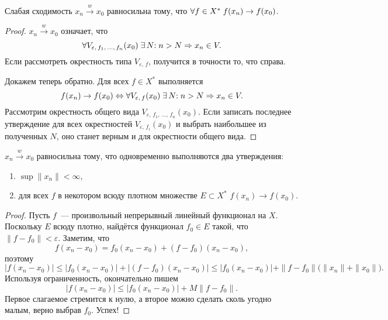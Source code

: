 \documentclass{notes}
\newcommand{\weak}{\xrightarrow{w}}
\begin{document}
	\begin{st}
		Слабая сходимость $x_n \weak x_0$ равносильна тому, что $\forall f \in X^{*} \; f(x_n) \to f(x_0)$.
		\begin{proof}
			$x_n \weak x_0$ означает, что
			\[
				\forall V_{\varepsilon, \, f_1, \, \ldots, \, f_n}(x_0) \; \exists \, N \text{\text{:}} \; n > N \Rightarrow x_n \in V.
			\]
			Если рассмотреть окрестность типа $V_{\varepsilon, \, f}$, получится в точности то, что справа.

			Докажем теперь обратно. Для всех $f \in X^{*}$ выполняется
			\[
				f(x_n) \to f(x_0) \Leftrightarrow \forall V_{\varepsilon, \, f}(x_0) \; \exists \, N \text{\text{:}} \; n > N \Rightarrow x_n \in V.
			\]
			Рассмотрим окрестность общего вида $V_{\varepsilon, \, f_1, \, \ldots, \, f_n}(x_0)$. Если записать последнее утверждение для всех окрестностей $V_{\varepsilon, \, f_i}(x_0)$ и выбрать наибольшее из полученных $N$, оно станет верным и для окрестности общего вида.
		\end{proof}
	\end{st}

	\begin{thm}	
		$x_n \weak x_0$ равносильна тому, что одновременно выполняются два утверждения:
		\begin{enumerate}
			\item $\sup \|x_n\| < \infty$,
			\item для всех $f$ в некотором всюду плотном множестве $E \subset X^{*}$ $f(x_n) \to f(x_0)$.
		\end{enumerate}
		\begin{proof}
			Пусть $f$~--- произвольный непрерывный линейный функционал на $X$. Поскольку $E$ всюду плотно, найдётся функционал $f_0 \in E$ такой, что $\|f - f_0\| < \varepsilon$. Заметим, что
			\[
				f(x_n - x_0) = f_0(x_n - x_0) + (f - f_0)(x_n - x_0),
			\]			
			поэтому
			\[
				\big|f(x_n - x_0)\big| \leqslant \big|f_0(x_n - x_0)\big| + \big|(f - f_0)(x_n - x_0)\big| \leqslant \big|f_0(x_n - x_0)\big| + \|f - f_0 \|\big(\|x_n\| + \|x_0\|\big).
			\]
			Используя ограниченность, окончательно пишем
			\[	
				\big|f(x_n - x_0)\big|  \leqslant \big|f_0(x_n - x_0)\big| + M \|f - f_0 \|.
			\]
			Первое слагаемое стремится к нулю, а второе можно сделать сколь угодно малым, верно выбрав $f_0$. Успех!
		\end{proof}
	\end{thm}
\end{document}
